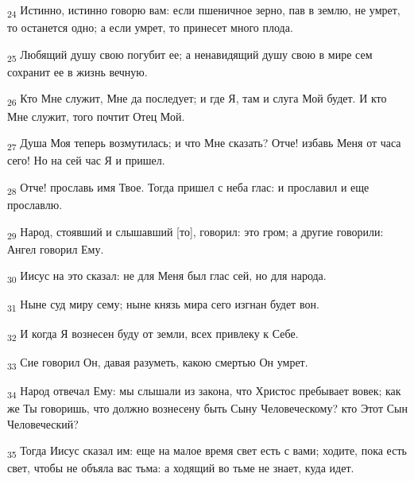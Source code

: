 \begin{tcolorbox}
\textsubscript{24} Истинно, истинно говорю вам: если пшеничное зерно, пав в землю, не умрет, то останется одно; а если умрет, то принесет много плода.
\end{tcolorbox}
\begin{tcolorbox}
\textsubscript{25} Любящий душу свою погубит ее; а ненавидящий душу свою в мире сем сохранит ее в жизнь вечную.
\end{tcolorbox}
\begin{tcolorbox}
\textsubscript{26} Кто Мне служит, Мне да последует; и где Я, там и слуга Мой будет. И кто Мне служит, того почтит Отец Мой.
\end{tcolorbox}
\begin{tcolorbox}
\textsubscript{27} Душа Моя теперь возмутилась; и что Мне сказать? Отче! избавь Меня от часа сего! Но на сей час Я и пришел.
\end{tcolorbox}
\begin{tcolorbox}
\textsubscript{28} Отче! прославь имя Твое. Тогда пришел с неба глас: и прославил и еще прославлю.
\end{tcolorbox}
\begin{tcolorbox}
\textsubscript{29} Народ, стоявший и слышавший [то], говорил: это гром; а другие говорили: Ангел говорил Ему.
\end{tcolorbox}
\begin{tcolorbox}
\textsubscript{30} Иисус на это сказал: не для Меня был глас сей, но для народа.
\end{tcolorbox}
\begin{tcolorbox}
\textsubscript{31} Ныне суд миру сему; ныне князь мира сего изгнан будет вон.
\end{tcolorbox}
\begin{tcolorbox}
\textsubscript{32} И когда Я вознесен буду от земли, всех привлеку к Себе.
\end{tcolorbox}
\begin{tcolorbox}
\textsubscript{33} Сие говорил Он, давая разуметь, какою смертью Он умрет.
\end{tcolorbox}
\begin{tcolorbox}
\textsubscript{34} Народ отвечал Ему: мы слышали из закона, что Христос пребывает вовек; как же Ты говоришь, что должно вознесену быть Сыну Человеческому? кто Этот Сын Человеческий?
\end{tcolorbox}
\begin{tcolorbox}
\textsubscript{35} Тогда Иисус сказал им: еще на малое время свет есть с вами; ходите, пока есть свет, чтобы не объяла вас тьма: а ходящий во тьме не знает, куда идет.
\end{tcolorbox}
